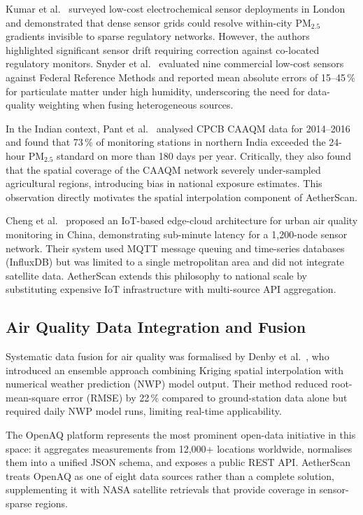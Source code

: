 \documentclass[12pt,a4paper]{article}
\begin{document}
Kumar et al.~\cite{kumar2015} surveyed low-cost electrochemical sensor
deployments in London and demonstrated that dense sensor grids could resolve
within-city $\text{PM}_{2.5}$ gradients invisible to sparse regulatory
networks. However, the authors highlighted significant sensor drift requiring
correction against co-located regulatory monitors. Snyder et al.~\cite{snyder2013}
evaluated nine commercial low-cost sensors against Federal Reference Methods and
reported mean absolute errors of 15--45\,\% for particulate matter under high
humidity, underscoring the need for data-quality weighting when fusing
heterogeneous sources.

In the Indian context, Pant et al.~\cite{pant2017} analysed CPCB CAAQM data
for 2014--2016 and found that 73\,\% of monitoring stations in northern India
exceeded the 24-hour $\text{PM}_{2.5}$ standard on more than 180 days per year.
Critically, they also found that the spatial coverage of the CAAQM network
severely under-sampled agricultural regions, introducing bias in national
exposure estimates. This observation directly motivates the spatial
interpolation component of AetherScan.

Cheng et al.~\cite{cheng2021} proposed an IoT-based edge-cloud architecture
for urban air quality monitoring in China, demonstrating sub-minute latency
for a 1,200-node sensor network. Their system used MQTT message queuing and
time-series databases (InfluxDB) but was limited to a single metropolitan area
and did not integrate satellite data. AetherScan extends this philosophy to
national scale by substituting expensive IoT infrastructure with multi-source
API aggregation.

\subsection{Air Quality Data Integration and Fusion}
\label{sec:litreview:fusion}

Systematic data fusion for air quality was formalised by Denby et al.~\cite{denby2011},
who introduced an ensemble approach combining Kriging spatial interpolation with
numerical weather prediction (NWP) model output. Their method reduced root-mean-square
error (RMSE) by 22\,\% compared to ground-station data alone but required daily
NWP model runs, limiting real-time applicability.

The OpenAQ platform \cite{openaq2016} represents the most prominent open-data
initiative in this space: it aggregates measurements from 12,000+ locations
worldwide, normalises them into a unified JSON schema, and exposes a public
REST API. AetherScan treats OpenAQ as one of eight data sources rather than
a complete solution, supplementing it with NASA satellite retrievals that
provide coverage in sensor-sparse regions.
\end{document}
